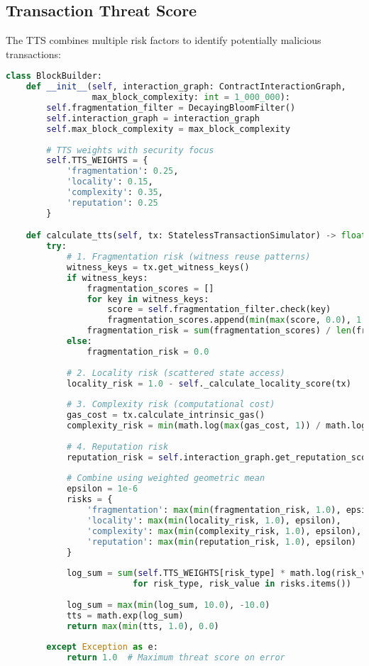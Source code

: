 \documentclass{article}
\begin{document}
\subsection{Transaction Threat Score}

The TTS combines multiple risk factors to identify potentially malicious transactions:

\begin{lstlisting}[language=Python,caption={Enhanced TTS Calculation},label={lst:tts}]
class BlockBuilder:
    def __init__(self, interaction_graph: ContractInteractionGraph, 
                 max_block_complexity: int = 1_000_000):
        self.fragmentation_filter = DecayingBloomFilter()
        self.interaction_graph = interaction_graph
        self.max_block_complexity = max_block_complexity
        
        # TTS weights with security focus
        self.TTS_WEIGHTS = {
            'fragmentation': 0.25,
            'locality': 0.15, 
            'complexity': 0.35,
            'reputation': 0.25
        }

    def calculate_tts(self, tx: StatelessTransactionSimulator) -> float:
        try:
            # 1. Fragmentation risk (witness reuse patterns)
            witness_keys = tx.get_witness_keys()
            if witness_keys:
                fragmentation_scores = []
                for key in witness_keys:
                    score = self.fragmentation_filter.check(key)
                    fragmentation_scores.append(min(max(score, 0.0), 1.0))
                fragmentation_risk = sum(fragmentation_scores) / len(fragmentation_scores)
            else:
                fragmentation_risk = 0.0
            
            # 2. Locality risk (scattered state access)
            locality_risk = 1.0 - self._calculate_locality_score(tx)
            
            # 3. Complexity risk (computational cost)
            gas_cost = tx.calculate_intrinsic_gas()
            complexity_risk = min(math.log(max(gas_cost, 1)) / math.log(1_000_000), 1.0)
            
            # 4. Reputation risk
            reputation_risk = self.interaction_graph.get_reputation_score(tx.sender_address)
            
            # Combine using weighted geometric mean
            epsilon = 1e-6
            risks = {
                'fragmentation': max(min(fragmentation_risk, 1.0), epsilon),
                'locality': max(min(locality_risk, 1.0), epsilon),
                'complexity': max(min(complexity_risk, 1.0), epsilon),
                'reputation': max(min(reputation_risk, 1.0), epsilon)
            }
            
            log_sum = sum(self.TTS_WEIGHTS[risk_type] * math.log(risk_value) 
                         for risk_type, risk_value in risks.items())
            
            log_sum = max(min(log_sum, 10.0), -10.0)
            tts = math.exp(log_sum)
            return max(min(tts, 1.0), 0.0)
            
        except Exception as e:
            return 1.0  # Maximum threat score on error
\end{lstlisting}
\end{document}
